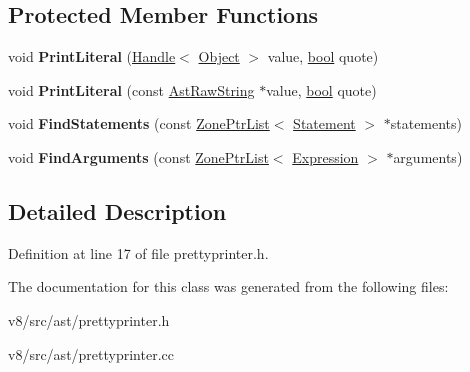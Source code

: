 \subsection*{Protected Member Functions}
\begin{DoxyCompactItemize}
\item 
\mbox{\label{classv8_1_1internal_1_1CallPrinter_a1ae571234fea3b29c0509a8c70298991}} 
void {\bfseries Print\+Literal} (\mbox{\hyperlink{classv8_1_1internal_1_1Handle}{Handle}}$<$ \mbox{\hyperlink{classv8_1_1internal_1_1Object}{Object}} $>$ value, \mbox{\hyperlink{classbool}{bool}} quote)
\item 
\mbox{\label{classv8_1_1internal_1_1CallPrinter_a05c24b0df6390ca4a79d0b639853a19c}} 
void {\bfseries Print\+Literal} (const \mbox{\hyperlink{classv8_1_1internal_1_1AstRawString}{Ast\+Raw\+String}} $\ast$value, \mbox{\hyperlink{classbool}{bool}} quote)
\item 
\mbox{\label{classv8_1_1internal_1_1CallPrinter_aeb96c3bf6e5a4fdd3faf64a16dab998d}} 
void {\bfseries Find\+Statements} (const \mbox{\hyperlink{classv8_1_1internal_1_1ZoneList}{Zone\+Ptr\+List}}$<$ \mbox{\hyperlink{classv8_1_1internal_1_1Statement}{Statement}} $>$ $\ast$statements)
\item 
\mbox{\label{classv8_1_1internal_1_1CallPrinter_a2b785d0cbc0c95bfeffab17d8f3d672a}} 
void {\bfseries Find\+Arguments} (const \mbox{\hyperlink{classv8_1_1internal_1_1ZoneList}{Zone\+Ptr\+List}}$<$ \mbox{\hyperlink{classv8_1_1internal_1_1Expression}{Expression}} $>$ $\ast$arguments)
\end{DoxyCompactItemize}


\subsection{Detailed Description}


Definition at line 17 of file prettyprinter.\+h.



The documentation for this class was generated from the following files\+:\begin{DoxyCompactItemize}
\item 
v8/src/ast/prettyprinter.\+h\item 
v8/src/ast/prettyprinter.\+cc\end{DoxyCompactItemize}
